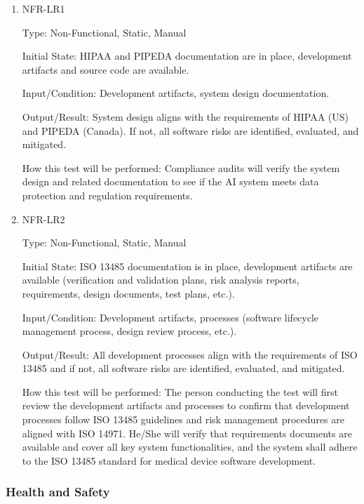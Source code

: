 \documentclass[12pt, titlepage]{article}
\begin{document}
\begin{enumerate}

\item{NFR-LR1\\}\label{NFR-LR1}

Type: Non-Functional, Static, Manual

Initial State: HIPAA and PIPEDA documentation are in place, development artifacts and source code are available.

Input/Condition: Development artifacts, system design documentation.

Output/Result: System design aligns with the requirements of HIPAA (US) and PIPEDA (Canada). If not, all software risks are identified, evaluated, and mitigated.

How this test will be performed: Compliance audits will verify the system design and related documentation to see if the AI system meets data protection and regulation requirements.

\item{NFR-LR2\\}\label{NFR-LR2}

Type: Non-Functional, Static, Manual

Initial State: ISO 13485 documentation is in place, development artifacts are available (verification and validation plans, risk analysis reports, requirements, design documents, test plans, etc.).

Input/Condition: Development artifacts, processes (software lifecycle management process, design review process, etc.).

Output/Result: All development processes align with the requirements of ISO 13485 and if not, all software risks are identified, evaluated, and mitigated.

How this test will be performed: The person conducting the test will first review the development artifacts and processes to confirm that development processes follow ISO 13485 guidelines and risk management procedures are aligned with ISO 14971. He/She will verify that requirements documents are available and cover all key system functionalities, and the system shall adhere to the ISO 13485 standard for medical device software development.

\end{enumerate}

\subsubsection{Health and Safety}
\end{document}
